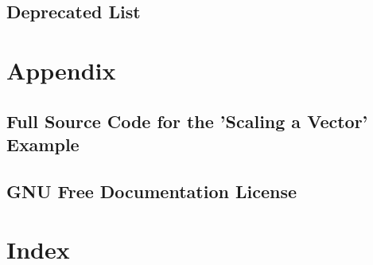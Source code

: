 











































\chapter{Deprecated List}
\label{deprecated}
\hypertarget{deprecated}{}


\part{Appendix}

\chapter{Full Source Code for the ’Scaling a Vector’ Example}
\label{FullSourceCodeVectorScal}
\hypertarget{FullSourceCodeVectorScal}{}


\chapter{GNU Free Documentation License}
\label{GNUFreeDocumentationLicense}
\hypertarget{GNUFreeDocumentationLicense}{}


\part{Index}
\printindex


